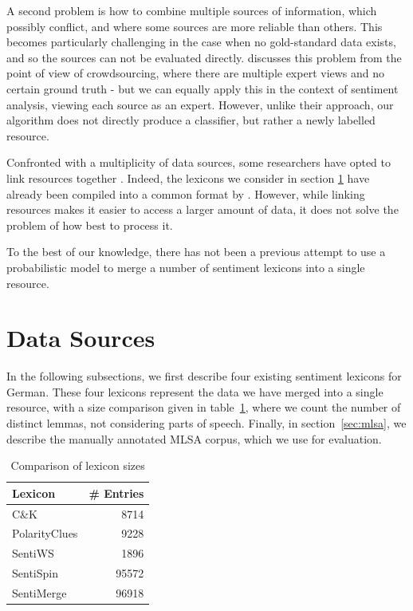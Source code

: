\documentclass[11pt]{article}
\begin{document}
A second problem is how to combine multiple sources of information, which possibly conflict, and where some sources are more reliable than others.  This becomes particularly challenging in the case when no gold-standard data exists, and so the sources can not be evaluated directly.   discusses this problem from the point of view of crowdsourcing, where there are multiple expert views and no certain ground truth - but we can equally apply this in the context of sentiment analysis, viewing each source as an expert.  However, unlike their approach, our algorithm does not directly produce a classifier, but rather a newly labelled resource.

Confronted with a multiplicity of data sources, some researchers have opted to link resources together \cite{eckle2013cookbook}. Indeed, the lexicons we consider in section \ref{sec:data} have already been compiled into a common format by . However, while linking resources makes it easier to access a larger amount of data, it does not solve the problem of how best to process it.

To the best of our knowledge, there has not been a previous attempt to use a probabilistic model to merge a number of sentiment lexicons into a single resource.


\section{Data Sources} \label{sec:data}

In the following subsections, we first describe four existing sentiment lexicons for German.  These four lexicons represent the data we have merged into a single resource, with a size comparison given in table~\ref{tab:size}, where we count the number of distinct lemmas, not considering parts of speech.  Finally, in section~\ref{sec:mlsa}, we describe the manually annotated MLSA corpus, which we use for evaluation.

\begin{table}[t]
\centering
    \begin{tabular}{|l|r|} \hline
	Lexicon        & \# Entries \\ \hline
	C\&K	& 8714 \\
	PolarityClues	& 9228 \\
	SentiWS	& 1896 \\
	SentiSpin	& 95572 \\ \hline
	SentiMerge	& 96918 \\ \hline
    \end{tabular}
\caption{Comparison of lexicon sizes}
\label{tab:size}
\end{table}
\end{document}
